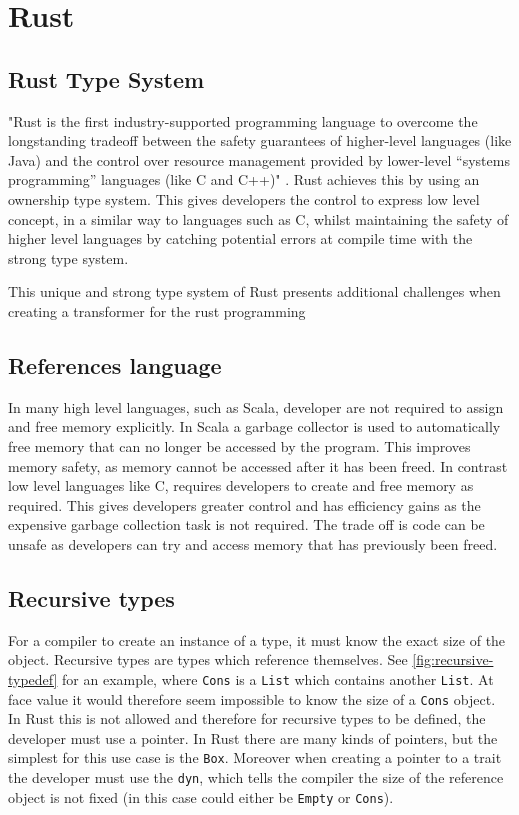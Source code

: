 \documentclass[ oneside,%
                    author={James Elgar},
                    degree={MEng},
                     title={Bidirectional transformer between functional and \\ object-oriented programming in Rust},
                  subtitle={}]{dissertation}
\begin{document}
\section{Rust}

\subsection{Rust Type System}
"Rust is the first industry-supported programming language to overcome the longstanding tradeoff between the safety guarantees of higher-level languages (like Java) and the control over resource management provided by lower-level “systems programming” languages (like C and C++)" \cite{rustsafesystems}. Rust achieves this by using an ownership type system. This gives developers the control to express low level concept, in a similar way to languages such as C, whilst maintaining the safety of higher level languages by catching potential errors at compile time with the strong type system. 

This unique and strong type system of Rust presents additional challenges when creating a transformer for the rust programming 

\subsection{References language}

In many high level languages, such as Scala, developer are not required to assign and free memory explicitly. In Scala a garbage collector is used to automatically free memory that can no longer be accessed by the program. This improves memory safety, as memory cannot be accessed after it has been freed. In contrast low level languages like C, requires developers to create and free memory as required. This gives developers greater control and has efficiency gains as the expensive garbage collection task is not required. The trade off is code can be unsafe as developers can try and access memory that has previously been freed.

\subsection{Recursive types}

For a compiler to create an instance of a type, it must know the exact size of the object. Recursive types are types which reference themselves. See \autoref{fig:recursive-typedef} for an example, where \verb|Cons| is a \verb|List| which contains another \verb|List|. At face value it would therefore seem impossible to know the size of a \verb|Cons| object. In Rust this is not allowed and therefore for recursive types to be defined, the developer must use a pointer. In Rust there are many kinds of pointers, but the simplest for this use case is the \verb|Box|. 
Moreover when creating a pointer to a trait the developer must use the \verb|dyn|, which tells the compiler the size of the reference object is not fixed (in this case could either be \verb|Empty| or \verb|Cons|). 
\end{document}
